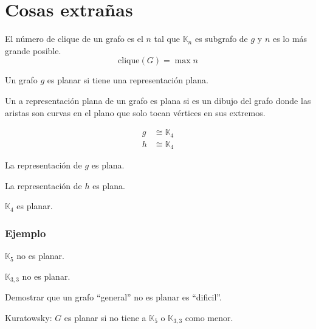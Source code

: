 \documentclass[../main.tex]{subfiles}
\begin{document}
\chapter{Cosas extrañas}%

\thispagestyle{fancy}


El número de clique de un grafo es el $n$ tal que $\mathbb{K}_n$ es subgrafo
de $g$ y $n$ es lo más grande posible.
\[
	\text{clique}(G) = \max n
\]


Un grafo $g$ es planar si tiene una representación plana.


Un a representación plana de un grafo es plana si es un dibujo del grafo donde
las aristas son curvas en el plano que solo tocan vértices en sus extremos.

\begin{figure}[H]
	\boldmath
	\centering
	
\end{figure}

\begin{align*}
	g &\cong \mathbb{K}_4\\
	h &\cong \mathbb{K}_4
\end{align*}

La representación de $g$ es plana.

La representación de $h$ es plana.

$\mathbb{K}_4$ es planar.

\subsection*{Ejemplo}%
$\mathbb{K}_5$ no es planar.

$\mathbb{K}_{3,3}$ no es planar.

Demostrar que un grafo ``general'' no es planar es ``dificil''.

\teorema
Kuratowsky: $G$ es planar si no tiene a $\mathbb{K}_5$ o $\mathbb{K}_{3,3}$
como menor.
\end{document}
